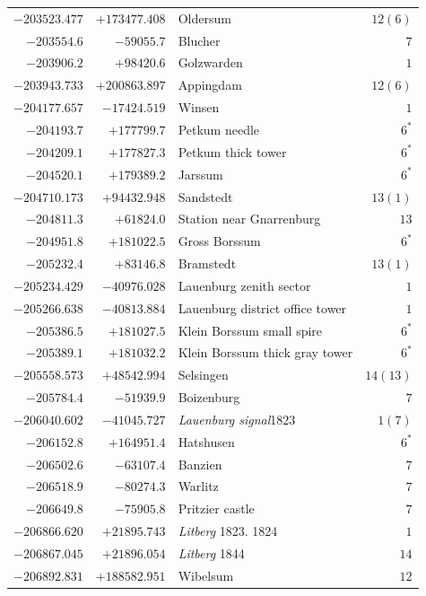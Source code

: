 \begin{center}
\begin{tabular}{r|r|p{170pt}|r}
\(-203523.477\)&\(+173477.408\)&Oldersum&\(12 (6)\)\\
\(-203554.6\)&\(-59055.7\)&Blucher&\(7\)\\
\(-203906.2\)&\(+98420.6\)&Golzwarden&\(1\)\\
\(-203943.733\)&\(+200863.897\)&Appingdam&\(12 (6)\)\\
\(-204177.657\)&\(-17424.519\)&Winsen&\(1\)\\
\(-204193.7\)&\(+177799.7\)&Petkum needle&\(6^{*}\)\\
\(-204209.1\)&\(+177827.3\)&Petkum thick tower&\(6^{*}\)\\
\(-204520.1\)&\(+179389.2\)&Jarssum&\(6^{*}\)\\
\(-204710.173\)&\(+94432.948\)&Sandstedt&\(13 (1)\)\\
\(-204811.3\)&\(+61824.0\)&Station near Gnarrenburg&\(13\)\\
\(-204951.8\)&\(+181022.5\)&Gross Borssum&\(6^{*}\)\\
\(-205232.4\)&\(+83146.8\)&Bramstedt&\(13 (1)\)\\
\(-205234.429\)&\(-40976.028\)&Lauenburg zenith sector&\(1\)\\
\(-205266.638\)&\(-40813.884\)&Lauenburg district office tower&\(1\)\\
\(-205386.5\)&\(+181027.5\)&Klein Borssum small spire&\(6^{*}\)\\
\(-205389.1\)&\(+181032.2\)&Klein Borssum thick gray tower&\(6^{*}\)\\
\(-205558.573\)&\(+48542.994\)&Selsingen&\(14(13)\)\\
\(-205784.4\)&\(-51939.9\)&Boizenburg&\(7\)\\
\(-206040.602\)&\(-41045.727\)&\textit{Lauenburg signal}1823&\(1 (7)\)\\
\(-206152.8\)&\(+164951.4\)&Hatshusen&\(6^{*}\)\\
\(-206502.6\)&\(-63107.4\)&Banzien&\(7\)\\
\(-206518.9\)&\(-80274.3\)&Warlitz&\(7\)\\
\(-206649.8\)&\(-75905.8\)&Pritzier castle&\(7\)\\
\(-206866.620\)&\(+21895.743\)&\textit{Litberg} 1823. 1824&\(1\)\\
\(-206867.045\)&\(+21896.054\)&\textit{Litberg} 1844&\(14\)\\
\(-206892.831\)&\(+188582.951\)&Wibelsum&\(12\)\\
\hline\end{tabular}\endgroup\end{center}
\clearpage
